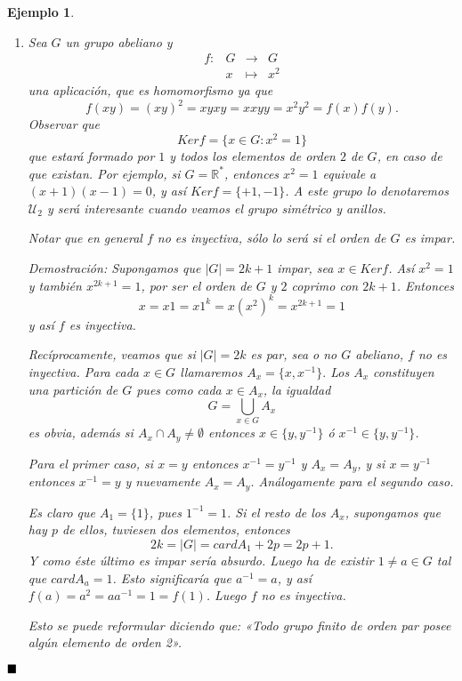 \documentclass[12pt]{article}
\newtheorem{example}{Ejemplo}[theorem]
\begin{document}
\begin{example}
\begin{enumerate}
\item Sea $G$ un grupo abeliano y $$\begin{array}{rccl}
f\colon &G & \longrightarrow & G\\
&x& \longmapsto &x^{2}
\end{array}
$$ una aplicación, que es homomorfismo ya que $$f(xy) = (xy)^{2} = xyxy = xxyy = x^{2}y^{2} = f(x)f(y).$$
Observar que $$Ker f = \lbrace x \in G : x^{2} = 1\rbrace$$ que estará formado por $1$ y todos los elementos de orden $2$ de $G$, en caso de que existan. Por ejemplo, si $G = \mathbb{R}^{\ast}$, entonces $x^{2} = 1$ equivale a $(x+1)(x-1) = 0$, y así $Ker f = \lbrace +1,-1\rbrace$. A este grupo lo denotaremos $\mathcal{U}_{2}$ y será interesante cuando veamos el \textit{grupo simétrico} y anillos.

Notar que en general $f$ no es inyectiva, sólo lo será si el orden de $G$ es impar.

\emph{Demostración: } Supongamos que $|G| = 2k+1$ impar, sea $x \in Ker f$. Así $x^{2} = 1$ y también $x^{2k+1} = 1$, por ser el orden de $G$ y $2$ coprimo con $2k+1$. Entonces $$x = x1 = x1^{k} = x(x^{2})^{k} = x^{2k+1} = 1$$ y así $f$ es inyectiva.

Recíprocamente, veamos que si $|G| = 2k$ es par, sea o no $G$ abeliano, $f$ no es inyectiva. Para cada $x \in G$ llamaremos $A_{x} = \lbrace x, x^{-1}\rbrace.$ Los $A_{x}$ constituyen una partición de $G$ pues como cada $x \in A_{x}$, la igualdad $$G = \bigcup_{x \in G} A_{x}$$ es obvia, además si $A_{x}\cap A_{y} \neq \emptyset$ entonces $x \in \lbrace y, y^{-1}\rbrace$ ó $x^{-1} \in \lbrace y,y^{-1}\rbrace$.

Para el primer caso, si $x = y$ entonces $x^{-1} = y^{-1}$ y $A_{x} = A_{y}$, y si $x = y^{-1}$ entonces $x^{-1} = y$ y nuevamente $A_{x} = A_{y}$. Análogamente para el segundo caso.

Es claro que $A_{1} = \lbrace 1 \rbrace$, pues $1^{-1} = 1$. Si el resto de los $A_{x}$, supongamos que hay $p$ de ellos, tuviesen dos elementos, entonces $$2k = |G| = card A_{1} + 2p = 2p +1.$$ Y como éste último es impar sería absurdo. Luego ha de existir $1 \neq a \in G$ tal que $card A_{a} = 1$. Esto significaría que $a^{-1} = a$, y así $f(a) = a^{2} = aa^{-1} = 1 = f(1)$. Luego $f$ no es inyectiva.

Esto se puede reformular diciendo que: \textit{«Todo grupo finito de orden par posee algún elemento de orden 2»}. 
\end{enumerate}
\end{example}
$\hfill \blacksquare$
\end{document}
